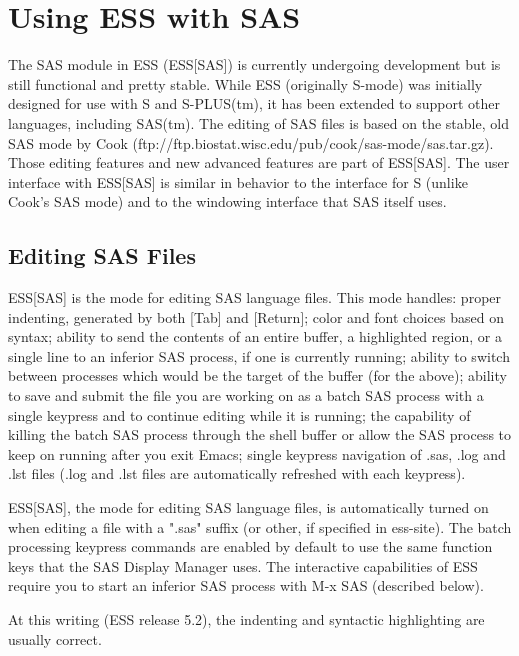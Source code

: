 \documentclass{article}
\begin{document}
\section{Using ESS with SAS}
\label{sec:SAS}

The SAS module in ESS (ESS[SAS]) is currently undergoing development
but is still functional and pretty stable.  While ESS (originally
S-mode) was initially designed for use with S and S-PLUS(tm), it has
been extended to support other languages, including SAS(tm).  The
editing of SAS files is based on the stable, old SAS mode by Cook
(ftp://ftp.biostat.wisc.edu/pub/cook/sas-mode/sas.tar.gz).  Those
editing features and new advanced features are part of ESS[SAS].  The
user interface with ESS[SAS] is similar in behavior to the interface
for S (unlike Cook's SAS mode) and to the windowing interface that SAS
itself uses.

\subsection{Editing SAS Files}
\label{sec:SAS:edit}

ESS[SAS] is the mode for editing SAS language files.  This mode
handles: proper indenting, generated by both [Tab] and [Return]; color
and font choices based on syntax; ability to send the contents of an
entire buffer, a highlighted region, or a single line to an inferior
SAS process, if one is currently running; ability to switch between
processes which would be the target of the buffer (for the above);
ability to save and submit the file you are working on as a batch SAS
process with a single keypress and to continue editing while it is
running; the capability of killing the batch SAS process through the
shell buffer or allow the SAS process to keep on running after you
exit Emacs; single keypress navigation of .sas, .log and .lst files
(.log and .lst files are automatically refreshed with each keypress).

ESS[SAS], the mode for editing SAS language files, is automatically
turned on when editing a file with a ".sas" suffix (or other, if
specified in ess-site).  The batch processing keypress commands are
enabled by default to use the same function keys that the SAS Display
Manager uses.  The interactive capabilities of ESS require you to
start an inferior SAS process with M-x SAS (described below).

At this writing (ESS release 5.2), the indenting and syntactic
highlighting are usually correct.
\end{document}
